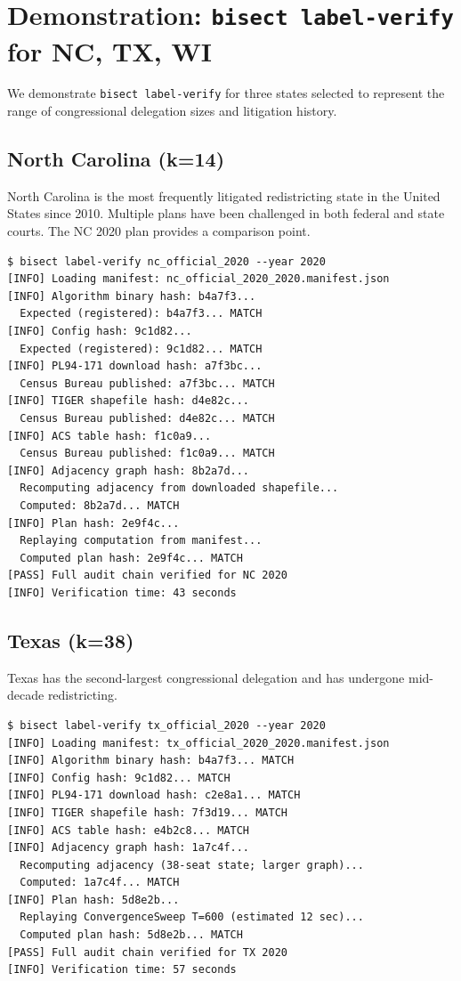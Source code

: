 \section{Demonstration: \texttt{bisect label-verify} for NC, TX, WI}
\label{sec:demo}

We demonstrate \texttt{bisect label-verify} for three states selected
to represent the range of congressional delegation sizes and litigation history.

\subsection{North Carolina (k=14)}

North Carolina is the most frequently litigated redistricting state in
the United States since 2010.
Multiple plans have been challenged in both federal and state courts.
The \bisect{} NC 2020 plan provides a comparison point.

\begin{lstlisting}
$ bisect label-verify nc_official_2020 --year 2020
[INFO] Loading manifest: nc_official_2020_2020.manifest.json
[INFO] Algorithm binary hash: b4a7f3...
  Expected (registered): b4a7f3... MATCH
[INFO] Config hash: 9c1d82...
  Expected (registered): 9c1d82... MATCH
[INFO] PL94-171 download hash: a7f3bc...
  Census Bureau published: a7f3bc... MATCH
[INFO] TIGER shapefile hash: d4e82c...
  Census Bureau published: d4e82c... MATCH
[INFO] ACS table hash: f1c0a9...
  Census Bureau published: f1c0a9... MATCH
[INFO] Adjacency graph hash: 8b2a7d...
  Recomputing adjacency from downloaded shapefile...
  Computed: 8b2a7d... MATCH
[INFO] Plan hash: 2e9f4c...
  Replaying computation from manifest...
  Computed plan hash: 2e9f4c... MATCH
[PASS] Full audit chain verified for NC 2020
[INFO] Verification time: 43 seconds
\end{lstlisting}

\subsection{Texas (k=38)}

Texas has the second-largest congressional delegation and has undergone
mid-decade redistricting.

\begin{lstlisting}
$ bisect label-verify tx_official_2020 --year 2020
[INFO] Loading manifest: tx_official_2020_2020.manifest.json
[INFO] Algorithm binary hash: b4a7f3... MATCH
[INFO] Config hash: 9c1d82... MATCH
[INFO] PL94-171 download hash: c2e8a1... MATCH
[INFO] TIGER shapefile hash: 7f3d19... MATCH
[INFO] ACS table hash: e4b2c8... MATCH
[INFO] Adjacency graph hash: 1a7c4f...
  Recomputing adjacency (38-seat state; larger graph)...
  Computed: 1a7c4f... MATCH
[INFO] Plan hash: 5d8e2b...
  Replaying ConvergenceSweep T=600 (estimated 12 sec)...
  Computed plan hash: 5d8e2b... MATCH
[PASS] Full audit chain verified for TX 2020
[INFO] Verification time: 57 seconds
\end{lstlisting}

